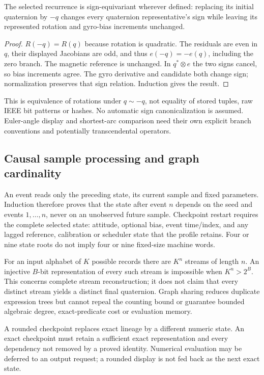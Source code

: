 \begin{proposition}
The selected recurrence is sign-equivariant wherever defined: replacing its
initial quaternion by $-q$ changes every quaternion representative's sign while
leaving its represented rotation and gyro-bias increments unchanged.
\end{proposition}
\begin{proof}
$R(-q)=R(q)$ because rotation is quadratic. The residuals are even in $q$,
their displayed Jacobians are odd, and thus $e(-q)=-e(q)$, including the zero
branch. The magnetic reference is unchanged. In
$q^*\otimes e$ the two signs cancel, so bias increments agree. The gyro derivative
and candidate both change sign; normalization preserves that sign relation.
Induction gives the result.
\end{proof}
This is equivalence of rotations under $q\sim-q$, not equality of stored tuples,
raw IEEE bit patterns or hashes. No automatic sign canonicalization is assumed.
Euler-angle display and shortest-arc comparison need their own explicit branch
conventions and potentially transcendental operators.

\subsection{Causal sample processing and graph cardinality}
An event reads only the preceding state, its current sample and fixed parameters.
Induction therefore proves that the state after event $n$ depends on the seed
and events $1,\ldots,n$, never on an unobserved future sample. Checkpoint restart
requires the complete selected state: attitude, optional bias, event time/index,
and any lagged reference, calibration or scheduler state that the profile retains.
Four or nine state roots do not imply four or nine fixed-size machine words.

For an input alphabet of $K$ possible records there are $K^n$ streams of length
$n$. An injective $B$-bit representation of every such stream is impossible when
$K^n>2^B$. This concerns complete stream reconstruction; it does not claim that
every distinct stream yields a distinct final quaternion. Graph sharing reduces
duplicate expression trees but cannot repeal the counting bound or guarantee
bounded algebraic degree, exact-predicate cost or evaluation memory.

A rounded checkpoint replaces exact lineage by a different numeric state. An
exact checkpoint must retain a sufficient exact representation and every
dependency not removed by a proved identity. Numerical evaluation may be deferred
to an output request; a rounded display is not fed back as the next exact state.

